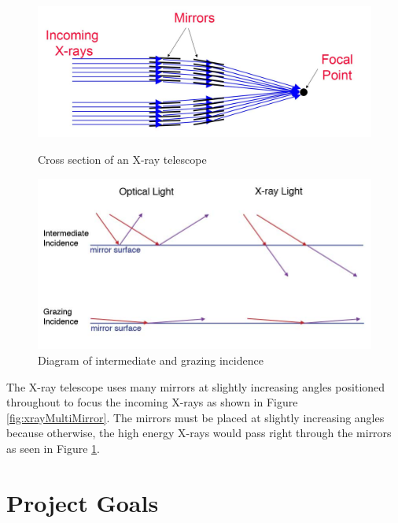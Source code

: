 \documentclass[12pt, oneside]{smuthesis}
\begin{document}
\begin{figure}[H]
	\centering
	\begin{minipage}{0.45\textwidth}
		\centering
		\includegraphics[width=\linewidth]{xrayTelescopeMultimirror}
		\caption{Cross section of an X-ray telescope \citep{telescope}}
		\label{fig:xrayMultiMirror}
	\end{minipage}
	\begin{minipage}{0.45\textwidth}
		\centering
		\includegraphics[width=\linewidth]{grazingIncidence}
		\caption{Diagram of intermediate and grazing incidence \citep{telescope}}
		\label{fig:grazingIncidence}
	\end{minipage}
\end{figure}

The X-ray telescope uses many mirrors at slightly increasing angles positioned throughout to focus the incoming X-rays as shown in Figure \ref{fig:xrayMultiMirror}. The mirrors must be placed at slightly increasing angles because otherwise, the high energy X-rays would pass right through the mirrors as seen in Figure \ref{fig:grazingIncidence}.

\section{\sc Project Goals} \label{expectedAchievements}
\end{document}
